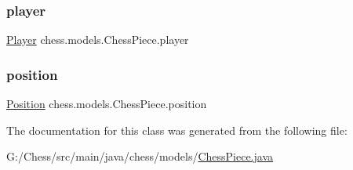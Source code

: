 \subsubsection{\texorpdfstring{player}{player}}
{\footnotesize\ttfamily \mbox{\hyperlink{enumchess_1_1models_1_1enums_1_1_player}{Player}} chess.\+models.\+Chess\+Piece.\+player\hspace{0.3cm}{\ttfamily [private]}}

\mbox{\label{classchess_1_1models_1_1_chess_piece_a0e4f8616b75e548f269d3971846396f3}} 
\subsubsection{\texorpdfstring{position}{position}}
{\footnotesize\ttfamily \mbox{\hyperlink{classchess_1_1models_1_1_position}{Position}} chess.\+models.\+Chess\+Piece.\+position\hspace{0.3cm}{\ttfamily [private]}}



The documentation for this class was generated from the following file\+:\begin{DoxyCompactItemize}
\item 
G\+:/\+Chess/src/main/java/chess/models/\mbox{\hyperlink{_chess_piece_8java}{Chess\+Piece.\+java}}\end{DoxyCompactItemize}
